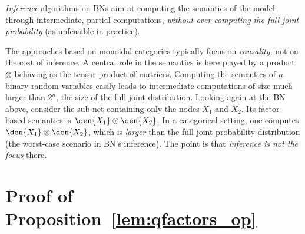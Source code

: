 \emph{Inference} algorithms on BNs aim at computing the semantics of the model through intermediate, partial computations, \emph{without ever computing the full joint probability} (as unfeasible in practice).

The approaches based on monoidal categories typically focus on \emph{causality}, not on the cost of inference.
A central role in the semantics is here played by a product $\otimes$ behaving as the tensor product of matrices.
Computing the semantics of $n$ binary random variables easily leads to intermediate computations of size much larger than $2^n$, the size of the full joint distribution.
Looking again at the BN above, consider the sub-net containing only the nodes $X_1$ and $X_2$.
Its factor-based semantics is $\den{X_1} \odot \den{X_2}$.
In a categorical setting, one computes $\den{X_1} \otimes \den{X_2}$, which is \emph{larger} than the full joint probability distribution (the worst-case scenario in BN's inference).
The point is that \emph{inference is not the focus} there.


\section{Proof of Proposition~\texorpdfstring{\ref{lem:qfactors_op}}{18}}
\label{app:section3}

